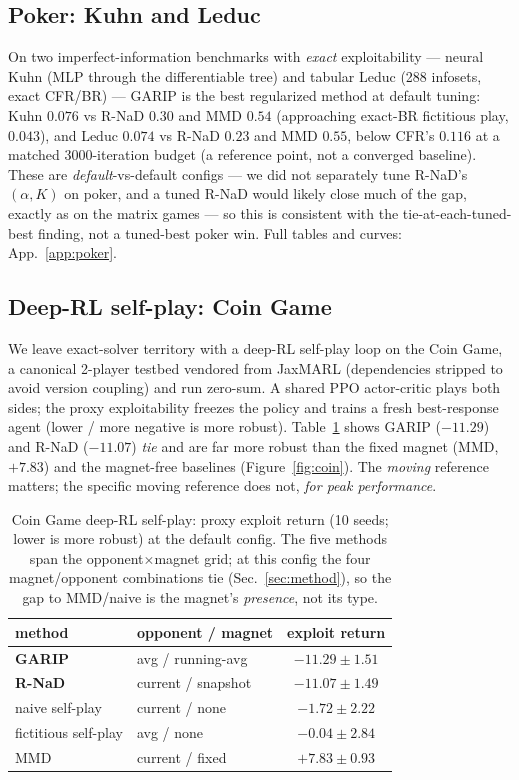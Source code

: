 \documentclass[10pt,twocolumn]{article}
\theoremstyle{plain}
\theoremstyle{remark}
\begin{document}
\subsection{Poker: Kuhn and Leduc}
On two imperfect-information benchmarks with \emph{exact} exploitability --- neural
Kuhn (MLP through the differentiable tree) and tabular Leduc (288 infosets, exact
CFR/BR) --- GARIP is the best regularized method at default tuning: Kuhn $0.076$ vs
R-NaD $0.30$ and MMD $0.54$ (approaching exact-BR fictitious play, $0.043$), and
Leduc $0.074$ vs R-NaD $0.23$ and MMD $0.55$, below CFR's $0.116$ at a matched
$3000$-iteration budget (a reference point, not a converged baseline). These are
\emph{default}-vs-default configs --- we did not separately tune R-NaD's
$(\alpha,K)$ on poker, and a tuned R-NaD would likely close much of the gap, exactly
as on the matrix games --- so this is consistent with the tie-at-each-tuned-best
finding, not a tuned-best poker win. Full tables and curves: App.~\ref{app:poker}.

\subsection{Deep-RL self-play: Coin Game}

We leave exact-solver territory with a deep-RL self-play loop on the Coin Game,
a canonical 2-player testbed vendored from JaxMARL (dependencies stripped to
avoid version coupling) and run zero-sum. A shared PPO actor-critic plays both
sides; the proxy exploitability freezes the policy and trains a fresh
best-response agent (lower / more negative is more robust).
Table~\ref{tab:coin} shows GARIP ($-11.29$) and R-NaD ($-11.07$) \emph{tie} and
are far more robust than the fixed magnet (MMD, $+7.83$) and the magnet-free
baselines (Figure~\ref{fig:coin}). The \emph{moving} reference matters; the
specific moving reference does not, \emph{for peak performance}.

\begin{table}[tbp]
\centering
\caption{Coin Game deep-RL self-play: proxy exploit return (10 seeds; lower is
more robust) at the default config. The five methods span the
opponent$\times$magnet grid; at this config the four magnet/opponent combinations
tie (Sec.~\ref{sec:method}), so the gap to MMD/naive is the magnet's
\emph{presence}, not its type.}
\label{tab:coin}
\small
\begin{tabular}{llc}
\toprule
method & opponent / magnet & exploit return \\
\midrule
\textbf{GARIP}        & avg / running-avg     & $\mathbf{-11.29 \pm 1.51}$ \\
\textbf{R-NaD}        & current / snapshot    & $\mathbf{-11.07 \pm 1.49}$ \\
naive self-play       & current / none        & $-1.72 \pm 2.22$ \\
fictitious self-play  & avg / none            & $-0.04 \pm 2.84$ \\
MMD                   & current / fixed       & $+7.83 \pm 0.93$ \\
\bottomrule
\end{tabular}
\end{table}
\end{document}
